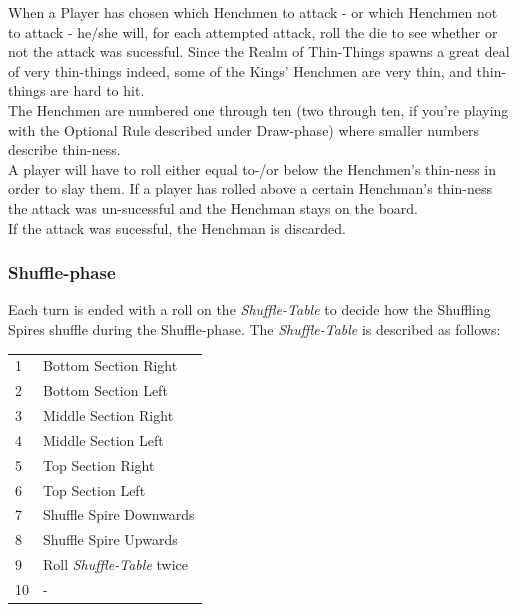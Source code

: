 \documentclass[11pt,twocolumn]{article}
\begin{document}
\noindent
When a Player has chosen which Henchmen to attack - or which Henchmen not to attack - he/she will, for each attempted attack, roll the die to see whether or not the attack was sucessful. Since the Realm of Thin-Things spawns a great deal of very thin-things indeed, some of the Kings' Henchmen are very thin, and thin-things are hard to hit. \\
The Henchmen are numbered one through ten (two through ten, if you're playing with the Optional Rule described under Draw-phase) where smaller numbers describe thin-ness. \\
A player will have to roll either equal to-/or below the Henchmen's thin-ness in order to slay them. If a player has rolled above a certain Henchman's thin-ness the attack was un-sucessful and the Henchman stays on the board. \\
If the attack was sucessful, the Henchman is discarded.


\subsubsection{Shuffle-phase}
Each turn is ended with a roll on the \textit{Shuffle-Table} to decide how the Shuffling Spires shuffle during the Shuffle-phase. The \textit{Shuffle-Table} is described as follows: \\

\begin{tabular}{ l l }
1 & Bottom Section Right \\
2 & Bottom Section Left \\
3 & Middle Section Right \\
4 & Middle Section Left \\
5 & Top Section Right \\
6 & Top Section Left \\
7 & Shuffle Spire Downwards\\
8 & Shuffle Spire Upwards \\
9 &  Roll \textit{Shuffle-Table} twice\\
10 & - \\
\end{tabular}
\end{document}
